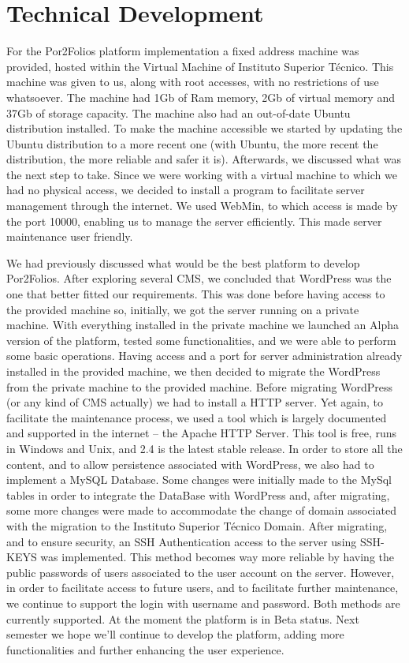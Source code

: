 \documentclass[a4paper,12pt,journal,twoside,compsoc]{PPIEEEtran}
\begin{document}
\section{Technical Development}
For the Por2Folios platform implementation a fixed address machine was provided, hosted within the Virtual Machine of Instituto Superior Técnico. This machine was given to us, along with root accesses, with no restrictions of use whatsoever. The machine had 1Gb of Ram memory, 2Gb of virtual memory and 37Gb of storage capacity. The machine also had an out-of-date Ubuntu distribution installed. To make the machine accessible we started by updating the Ubuntu distribution to a more recent one (with Ubuntu, the more recent the distribution, the more reliable and safer it is). Afterwards, we discussed what was the next step to take. Since we were working with a virtual machine to which we had no physical access, we decided to install a program to facilitate server management through the internet.  We used WebMin, to which access is made by the port 10000, enabling us to manage the server efficiently. This made server maintenance user friendly.

We had previously discussed what would be the best platform to develop Por2Folios. After exploring several \ac{CMS}, we concluded that WordPress was the one that better fitted our requirements. This was done before having access to the provided machine so, initially, we got the server running on a private machine. With everything installed in the private machine we launched an Alpha version of the platform, tested some functionalities, and we were able to perform some basic operations.
Having access and a port for server administration already installed in the provided machine, we then decided to migrate the WordPress from the private machine to the provided machine.
Before migrating WordPress (or any kind of \ac{CMS} actually) we had to install a HTTP server. Yet again, to facilitate the maintenance process, we used a tool which is largely documented and supported in the internet -- the Apache HTTP Server. This tool is free, runs in Windows and Unix, and 2.4 is the latest stable release. 
In order to store all the content, and to allow persistence associated with WordPress, we also had to implement a MySQL Database. Some changes were initially made to the MySql tables in order to integrate the DataBase with WordPress and, after migrating, some more changes were made to accommodate the change of domain associated with the migration to the Instituto Superior Técnico Domain.
After migrating, and to ensure security, an SSH Authentication access to the server using SSH-KEYS was implemented. This method becomes way more reliable by having the public passwords of users associated to the user account on the server. However, in order to facilitate access to future users, and to facilitate further maintenance, we continue to support the login with username and password. Both methods are currently supported.
At the moment the platform is in Beta status. Next semester we hope we'll continue to develop the platform, adding more functionalities and further enhancing the user experience.
\end{document}
